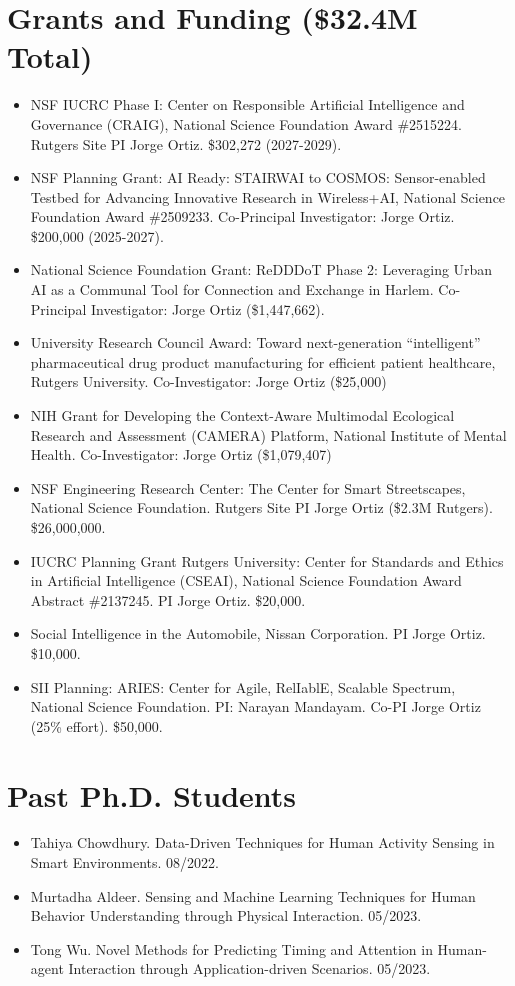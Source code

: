 \documentclass[12pt]{article}
\begin{document}
\section{Grants and Funding (\$32.4M Total)}
\begin{itemize}
    \item NSF IUCRC Phase I: Center on Responsible Artificial Intelligence and Governance (CRAIG), National Science Foundation Award \#2515224. Rutgers Site PI Jorge Ortiz. \$302,272 (2027-2029).
    \item NSF Planning Grant: AI Ready: STAIRWAI to COSMOS: Sensor-enabled Testbed for Advancing Innovative Research in Wireless+AI, National Science Foundation Award \#2509233. Co-Principal Investigator: Jorge Ortiz. \$200,000 (2025-2027).
    \item National Science Foundation Grant: ReDDDoT Phase 2: Leveraging Urban AI as a Communal Tool for Connection and Exchange in Harlem. Co-Principal Investigator: Jorge Ortiz (\$1,447,662).
    \item University Research Council Award: Toward next-generation ``intelligent'' pharmaceutical drug product manufacturing for efficient patient healthcare, Rutgers University. Co-Investigator: Jorge Ortiz (\$25,000)
    \item NIH Grant for Developing the Context-Aware Multimodal Ecological Research and Assessment (CAMERA) Platform, National Institute of Mental Health. Co-Investigator: Jorge Ortiz (\$1,079,407)
    \item NSF Engineering Research Center: The Center for Smart Streetscapes, National Science Foundation. Rutgers Site PI Jorge Ortiz (\$2.3M Rutgers). \$26,000,000.
    \item IUCRC Planning Grant Rutgers University: Center for Standards and Ethics in Artificial Intelligence (CSEAI), National Science Foundation Award Abstract \#2137245. PI Jorge Ortiz. \$20,000.
    \item Social Intelligence in the Automobile, Nissan Corporation. PI Jorge Ortiz. \$10,000.
    \item SII Planning: ARIES: Center for Agile, RelIablE, Scalable Spectrum, National Science Foundation. PI: Narayan Mandayam. Co-PI Jorge Ortiz (25\% effort). \$50,000.
\end{itemize}




\section{Past Ph.D. Students}
\begin{itemize}
    \item Tahiya Chowdhury. Data-Driven Techniques for Human Activity Sensing in Smart Environments. 08/2022.
    \item Murtadha Aldeer. Sensing and Machine Learning Techniques for Human Behavior Understanding through Physical Interaction. 05/2023.
    \item Tong Wu. Novel Methods for Predicting Timing and Attention in Human-agent Interaction through Application-driven Scenarios. 05/2023.
\end{itemize}
\end{document}
